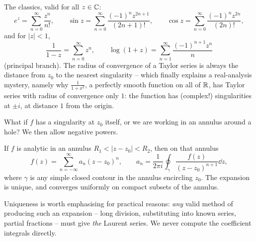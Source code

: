 \documentclass[a4paper]{scrartcl}
\begin{document}
\begin{example}
	The classics, valid for all $z \in \mathbb{C}$:
	$$
	e^z = \sum_{n=0}^\infty \frac{z^n}{n!}, \qquad
	\sin z = \sum_{n=0}^\infty \frac{(-1)^n z^{2n+1}}{(2n+1)!}, \qquad
	\cos z = \sum_{n=0}^\infty \frac{(-1)^n z^{2n}}{(2n)!},
	$$
	and for $|z| < 1$,
	$$
	\frac{1}{1 - z} = \sum_{n = 0}^\infty z^n, \qquad \log(1 + z) = \sum_{n=1}^\infty \frac{(-1)^{n+1} z^n}{n}
	$$
	(principal branch). The radius of convergence of a Taylor series is always the distance from $z_0$ to the nearest singularity -- which finally explains a real-analysis mystery, namely why $\frac{1}{1 + x^2}$, a perfectly smooth function on all of $\mathbb{R}$, has Taylor series with radius of convergence only $1$: the function has (complex!) singularities at $\pm i$, at distance $1$ from the origin.
\end{example}

What if $f$ has a singularity at $z_0$ itself, or we are working in an annulus around a hole? We then allow negative powers.

\begin{theorem}
	If $f$ is analytic in an annulus $R_1 < |z - z_0| < R_2$, then on that annulus
	$$
	f(z) = \sum_{n = -\infty}^{\infty} a_n (z - z_0)^n, \qquad a_n = \frac{1}{2\pi i} \oint_\gamma \frac{f(z)}{(z - z_0)^{n + 1}} \dd z,
	$$
	where $\gamma$ is any simple closed contour in the annulus encircling $z_0$. The expansion is unique, and converges uniformly on compact subsets of the annulus.
\end{theorem}

Uniqueness is worth emphasising for practical reasons: \emph{any} valid method of producing such an expansion -- long division, substituting into known series, partial fractions -- must give \emph{the} Laurent series. We never compute the coefficient integrals directly.
\end{document}
